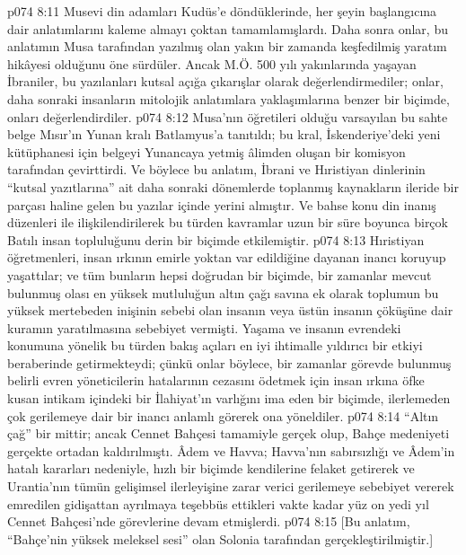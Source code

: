 \vs p074 8:11 Musevi din adamları Kudüs’e döndüklerinde, her şeyin başlangıcına dair anlatımlarını kaleme almayı çoktan tamamlamışlardı. Daha sonra onlar, bu anlatımın Musa tarafından yazılmış olan yakın bir zamanda keşfedilmiş yaratım hikâyesi olduğunu öne sürdüler. Ancak M.Ö. 500 yılı yakınlarında yaşayan İbraniler, bu yazılanları kutsal açığa çıkarışlar olarak değerlendirmediler; onlar, daha sonraki insanların mitolojik anlatımlara yaklaşımlarına benzer bir biçimde, onları değerlendirdiler.
\vs p074 8:12 Musa’nın öğretileri olduğu varsayılan bu sahte belge Mısır’ın Yunan kralı Batlamyus’a tanıtıldı; bu kral, İskenderiye’deki yeni kütüphanesi için belgeyi Yunancaya yetmiş âlimden oluşan bir komisyon tarafından çevirttirdi. Ve böylece bu anlatım, İbrani ve Hıristiyan dinlerinin “kutsal yazıtlarına” ait daha sonraki dönemlerde toplanmış kaynakların ileride bir parçası haline gelen bu yazılar içinde yerini almıştır. Ve bahse konu din inanış düzenleri ile ilişkilendirilerek bu türden kavramlar uzun bir süre boyunca birçok Batılı insan topluluğunu derin bir biçimde etkilemiştir.
\vs p074 8:13 Hıristiyan öğretmenleri, insan ırkının emirle yoktan var edildiğine dayanan inancı koruyup yaşattılar; ve tüm bunların hepsi doğrudan bir biçimde, bir zamanlar mevcut bulunmuş olası en yüksek mutluluğun altın çağı savına ek olarak toplumun bu yüksek mertebeden inişinin sebebi olan insanın veya üstün insanın çöküşüne dair kuramın yaratılmasına sebebiyet vermişti. Yaşama ve insanın evrendeki konumuna yönelik bu türden bakış açıları en iyi ihtimalle yıldırıcı bir etkiyi beraberinde getirmekteydi; çünkü onlar böylece, bir zamanlar görevde bulunmuş belirli evren yöneticilerin hatalarının cezasını ödetmek için insan ırkına öfke kusan intikam içindeki bir İlahiyat’ın varlığını ima eden bir biçimde, ilerlemeden çok gerilemeye dair bir inancı anlamlı görerek ona yöneldiler.
\vs p074 8:14 “Altın çağ” bir mittir; ancak Cennet Bahçesi tamamiyle gerçek olup, Bahçe medeniyeti gerçekte ortadan kaldırılmıştı. Âdem ve Havva; Havva’nın sabırsızlığı ve Âdem’in hatalı kararları nedeniyle, hızlı bir biçimde kendilerine felaket getirerek ve Urantia’nın tümün gelişimsel ilerleyişine zarar verici gerilemeye sebebiyet vererek emredilen gidişattan ayrılmaya teşebbüs ettikleri vakte kadar yüz on yedi yıl Cennet Bahçesi’nde görevlerine devam etmişlerdi.
\vs p074 8:15 [Bu anlatım, “Bahçe’nin {yüksek} meleksel sesi” olan Solonia tarafından gerçekleştirilmiştir.]
